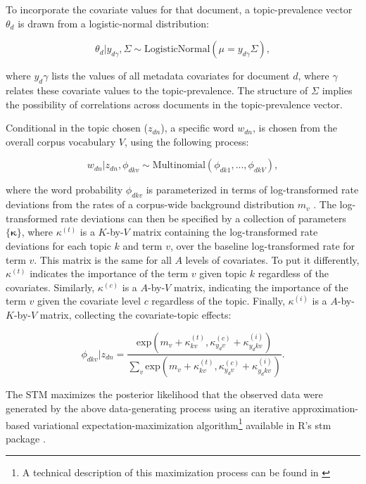 \documentclass[12pt,a4paper,notitlepage]{article}
\begin{document}
To incorporate the covariate values for that document, a topic-prevalence vector $\theta_d$ is drawn from a logistic-normal distribution:

\begin{equation}
	\theta_d|y_{d\gamma},\Sigma \sim \textrm{LogisticNormal}(\mu = y_{d\gamma}\Sigma),
\end{equation}

where $y_d\gamma$ lists the values of all metadata covariates for document $d$, where $\gamma$ relates these covariate values to the topic-prevalence. The structure of $\Sigma$ implies the possibility of correlations across documents in the topic-prevalence vector. 

Conditional in the topic chosen ($z_{dn}$), a specific word $w_{dn}$, is chosen from the overall corpus vocabulary $V$, using the following process:

\begin{equation}
	w_{dn}|z_{dn},\phi_{dkv} \sim \textrm{Multinomial}(\phi_{dk1},...,\phi_{dkV}),
\end{equation}

where the word probability $\phi_{dkv}$ is parameterized in terms of log-transformed rate deviations from the rates of a corpus-wide background distribution $m_v$ \citep{roberts_structural_2013}. The log-transformed rate deviations can then be specified by a collection of parameters $\lbrace \boldsymbol{\kappa} \rbrace$, where $\kappa^{(t)}$ is a $K$-by-$V$ matrix containing the log-transformed rate deviations for each topic $k$ and term $v$, over the baseline log-transformed rate for term $v$. This matrix is the same for all $A$ levels of covariates. To put it differently, $\kappa^{(t)}$ indicates the importance of the term $v$ given topic $k$ regardless of the covariates. Similarly, $\kappa^{(c)}$ is a $A$-by-$V$ matrix, indicating the importance of the term $v$ given the covariate level $c$ regardless of the topic. Finally, $\kappa^{(i)}$ is a $A$-by-$K$-by-$V$ matrix, collecting the covariate-topic effects:

\begin{equation}
	\phi_{dkv}|z_{dn}=\frac{\textrm{exp}(m_v+\kappa^{(t)}_{kv},\kappa^{(c)}_{y_dv}+\kappa^{(i)}_{y_dkv})}{\sum_v \textrm{exp}(m_v+\kappa^{(t)}_{kv},\kappa^{(c)}_{y_dv}+\kappa^{(i)}_{y_dkv})}.
\end{equation}

The STM maximizes the posterior likelihood that the observed data were generated by the above data-generating process using an iterative approximation-based variational expectation-maximization algorithm\footnote{A technical description of this maximization process can be found in \citet{roberts_model_2016}} available in R's stm package \citep{roberts_stm:_2016}. 
\end{document}
